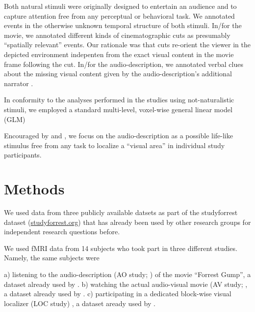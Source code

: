 \documentclass[english]{article}
\begin{document}
Both natural stimuli were originally designed to entertain an audience and to capture attention free from any perceptual or behavioral task.
We annotated events in the otherwise unknown temporal structure of both stimuli.
In/for the movie, we annotated different kinds of cinematographic cuts \citep{haeusler2016cutanno} as presumably ``spatially relevant'' events.
Our rationale was that cuts re-orient the viewer in the depicted environment
indepenten from the exact visual content in the movie frame following the cut.
In/for the audio-description, we annotated verbal clues about the missing visual content given by the audio-description's additional narrator \citep{haeusler2020speechanno}.

In conformity to the analyses performed in the studies using not-naturalistic stimuli, we employed a standard multi-level, voxel-wise general linear model (GLM) %

Encouraged by \citep{aziz2008modulation} and \citep{aminoff2013role}, we focus on the audio-description as a possible life-like stimulus free from any task to localize a ``visual area'' in individual study participants.



\section{Methods}


We used data from three publicly available datsets as part of the studyforrest
dataset (\href{http://www.studyforrest.org}{studyforrest.org}) that has already
been used by other research groups for independent research questions before.

We used fMRI data from 14 subjects who took part in three different studies. Namely, the same subjects were

a) listening to the audio-description (AO study; \citep{hanke2014audiomovie}) of
the movie ``Forrest Gump'', a dataset already used by \citep{hu2017decoding}.
b) watching the actual audio-visual movie (AV study;
\citep{hanke2016simultaneous}, a dataset already used by
\citep{ben2018hippocampal}. c) participating in a dedicated block-wise visual
localizer (LOC study) \citep{sengupta2016extension}, a dataset aready used by
\citep{jiahui2019predicting}.
\end{document}
